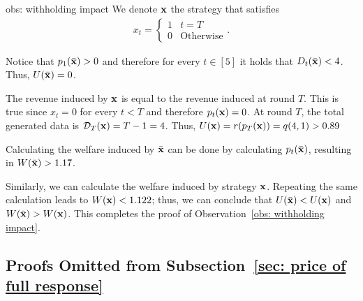 \begin{proofof}{obs: withholding impact}
We denote ${\bf{x}}$ the strategy that satisfies
\begin{align*}
x_t = \begin{cases}
    1 & \mbox{$t = T$} \\
    0 & \mbox{Otherwise}
\end{cases}.
\end{align*}

Notice that $p_1(\Bar{{\bf{x}}}) > 0$ and therefore for every $t \in [5]$ it holds that $D_t(\Bar{{\bf{x}}}) < 4$. Thus, $U(\Bar{{\bf{x}}}) = 0$.

The revenue induced by ${\bf{x}}$ is equal to the revenue induced at round $T$. This is true since $x_t = 0$ for every $t < T$ and therefore $p_t({\bf{x}}) = 0$. At round $T$, the total generated data is $\mathcal{D}_T({\bf{x}}) = T-1 = 4$. Thus, $U({\bf{x}}) = r(p_T({\bf{x}})) = q(4, 1) > 0.89$

Calculating the welfare induced by $\Bar{{\bf{x}}}$ can be done by calculating $p_t(\Bar{{\bf{x}}})$, resulting in $W(\Bar{{\bf{x}}}) > 1.17$.

Similarly, we can calculate the welfare induced by strategy ${\bf{x}}$. Repeating the same calculation leads to $W({\bf{x}}) < 1.122$; thus, we can conclude that $U(\Bar{{\bf{x}}}) < U({\bf{x}})$ and $W(\Bar{{\bf{x}}}) > W({\bf{x}})$. This completes the proof of Observation~\ref{obs: withholding impact}.
\end{proofof}





\subsection{Proofs Omitted from Subsection~\ref{sec: price of full response}} \label{appn: full response}

